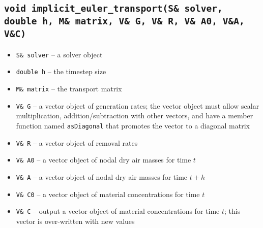 \documentclass[10pt]{report}
\begin{document}
\subsection{\texttt{void implicit\_euler\_transport(S\& solver, double h, M\& matrix, V\& G, V\& R, V\& A0, V\&A, V\&C)}}
\begin{itemize}
\item \texttt{S\& solver} -- a solver object
\item \texttt{double h} -- the timestep size
\item \texttt{M\& matrix} -- the transport matrix
\item \texttt{V\& G} -- a vector object of generation rates; the vector object must allow scalar multiplication, addition/subtraction with other vectors, and have a member function named \texttt{asDiagonal} that promotes the vector to a diagonal matrix
\item \texttt{V\& R} -- a vector object of removal rates
\item \texttt{V\& A0} -- a vector object of nodal dry air masses for time $t$
\item \texttt{V\& A} -- a vector object of nodal dry air masses for time $t+h$
\item \texttt{V\& C0} -- a vector object of material concentrations for time $t$
\item \texttt{V\& C} -- output a vector object of material concentrations for time $t$; this vector is over-written with new values
\end{itemize}
\end{document}
